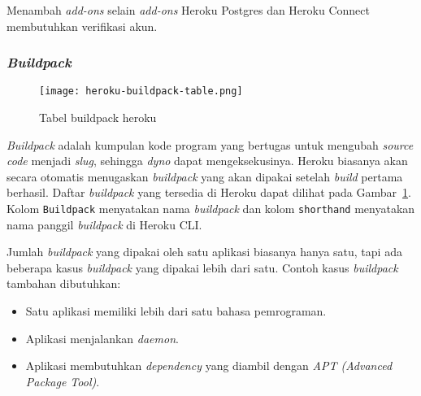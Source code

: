 Menambah \textit{add-ons} selain \textit{add-ons} Heroku Postgres dan Heroku Connect membutuhkan verifikasi akun.

\subsubsection{\textit{Buildpack}}
\begin{figure}[H]
	\centering  
	\texttt{[image: heroku-buildpack-table.png]}  
	\caption[Tabel buildpack heroku]{Tabel buildpack heroku} 
	\label{fig:heroku-buildpack-table} 
\end{figure}

\textit{Buildpack} adalah kumpulan kode program yang bertugas untuk mengubah \textit{source code} menjadi \textit{slug}, sehingga \textit{dyno} dapat mengeksekusinya. Heroku biasanya akan secara otomatis menugaskan \textit{buildpack} yang akan dipakai setelah \textit{build} pertama berhasil. Daftar \textit{buildpack} yang tersedia di Heroku dapat dilihat pada Gambar~\ref{fig:heroku-buildpack-table}. Kolom \texttt{Buildpack} menyatakan nama \textit{buildpack} dan kolom \texttt{shorthand} menyatakan nama panggil \textit{buildpack} di Heroku CLI.

Jumlah \textit{buildpack} yang dipakai oleh satu aplikasi biasanya hanya satu, tapi ada beberapa kasus \textit{buildpack} yang dipakai lebih dari satu. Contoh kasus \textit{buildpack} tambahan dibutuhkan:
\begin{itemize}
\item Satu aplikasi memiliki lebih dari satu bahasa pemrograman.
\item Aplikasi menjalankan \textit{daemon}.
\item Aplikasi membutuhkan \textit{dependency} yang diambil dengan \textit{APT (Advanced Package Tool)}.
\end{itemize}

